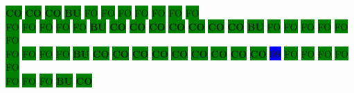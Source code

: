 \colorbox{green}{\color[rgb]{0,0,0}\textbf{CO}}%
\colorbox{green}{\color[rgb]{0,0,0}\textbf{CO}}%
\colorbox{green}{\color[rgb]{0,0,0}\textbf{CO}}%
\colorbox{green}{\color[rgb]{1,0,0}\textbf{BU}}%
\colorbox{green}{\color[gray]{0.75}FO}%
\colorbox{green}{\color[gray]{0.75}FO}%
\colorbox{green}{\color[gray]{0.75}FO}%
\colorbox{green}{\color[gray]{0.75}FO}%
\colorbox{green}{\color[gray]{0.75}FO}%
\colorbox{green}{\color[gray]{0.75}FO}%
\colorbox{green}{\color[gray]{0.75}FO}%
\\
\colorbox{green}{\color[gray]{0.75}FO}%
\colorbox{green}{\color[gray]{0.75}FO}%
\colorbox{green}{\color[gray]{0.75}FO}%
\colorbox{green}{\color[gray]{0.75}FO}%
\colorbox{green}{\color[gray]{0.75}FO}%
\colorbox{green}{\color[rgb]{1,0,0}\textbf{BU}}%
\colorbox{green}{\color[rgb]{0,0,0}\textbf{CO}}%
\colorbox{green}{\color[rgb]{0,0,0}\textbf{CO}}%
\colorbox{green}{\color[rgb]{0,0,0}\textbf{CO}}%
\colorbox{green}{\color[rgb]{0,0,0}\textbf{CO}}%
\colorbox{green}{\color[rgb]{0,0,0}\textbf{CO}}%
\colorbox{green}{\color[rgb]{0,0,0}\textbf{CO}}%
\colorbox{green}{\color[rgb]{0,0,0}\textbf{CO}}%
\colorbox{green}{\color[rgb]{1,0,0}\textbf{BU}}%
\colorbox{green}{\color[gray]{0.75}FO}%
\colorbox{green}{\color[gray]{0.75}FO}%
\colorbox{green}{\color[gray]{0.75}FO}%
\colorbox{green}{\color[gray]{0.75}FO}%
\colorbox{green}{\color[gray]{0.75}FO}%
\colorbox{green}{\color[gray]{0.75}FO}%
\\
\colorbox{green}{\color[gray]{0.75}FO}%
\colorbox{green}{\color[gray]{0.75}FO}%
\colorbox{green}{\color[gray]{0.75}FO}%
\colorbox{green}{\color[gray]{0.75}FO}%
\colorbox{green}{\color[rgb]{1,0,0}\textbf{BU}}%
\colorbox{green}{\color[rgb]{0,0,0}\textbf{CO}}%
\colorbox{green}{\color[rgb]{0,0,0}\textbf{CO}}%
\colorbox{green}{\color[rgb]{0,0,0}\textbf{CO}}%
\colorbox{green}{\color[rgb]{0,0,0}\textbf{CO}}%
\colorbox{green}{\color[rgb]{0,0,0}\textbf{CO}}%
\colorbox{green}{\color[rgb]{0,0,0}\textbf{CO}}%
\colorbox{green}{\color[rgb]{0,0,0}\textbf{CO}}%
\colorbox{green}{\color[rgb]{0,0,0}\textbf{CO}}%
\colorbox{green}{\color[rgb]{0,0,0}\textbf{CO}}%
\colorbox{blue}{\color[rgb]{1,0,0}\textbf{09}}%
\colorbox{green}{\color[gray]{0.75}FO}%
\colorbox{green}{\color[gray]{0.75}FO}%
\colorbox{green}{\color[gray]{0.75}FO}%
\colorbox{green}{\color[gray]{0.75}FO}%
\colorbox{green}{\color[gray]{0.75}FO}%
\\
\colorbox{green}{\color[gray]{0.75}FO}%
\colorbox{green}{\color[gray]{0.75}FO}%
\colorbox{green}{\color[gray]{0.75}FO}%
\colorbox{green}{\color[rgb]{1,0,0}\textbf{BU}}%
\colorbox{green}{\color[rgb]{0,0,0}\textbf{CO}}%
